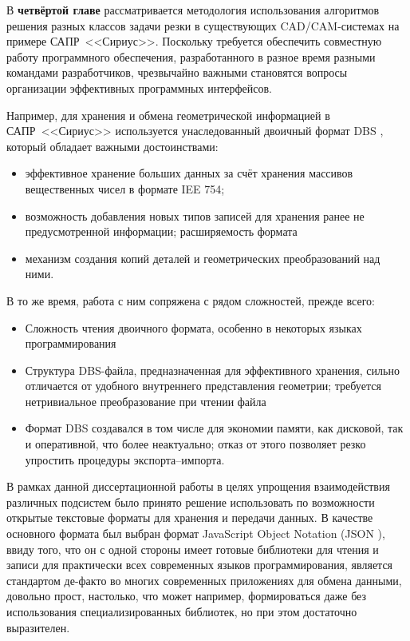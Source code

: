 
В {\bf четвёртой главе}
рассматривается методология
использования алгоритмов решения
разных классов задачи резки в существующих
CAD/CAM-системах на примере
САПР~<<Сириус>>.
Поскольку требуется обеспечить
совместную работу программного обеспечения,
разработанного в разное время разными командами разработчиков,
чрезвычайно важными становятся вопросы
организации эффективных программных интерфейсов.

Например, для хранения и обмена геометрической информацией
в САПР~<<Сириус>>
используется унаследованный двоичный формат DBS
\cite{bi:DBS},
который обладает важными достоинствами:
\begin{itemize}
  \item
  эффективное хранение больших данных за счёт хранения массивов вещественных чисел в формате IEE 754;
  \item
  возможность добавления новых типов записей для хранения ранее не предусмотренной информации;
  расширяемость формата
  \item
  механизм создания копий деталей и геометрических преобразований над ними.
\end{itemize}

В то же время,
работа с ним сопряжена с рядом сложностей,
прежде всего:
\begin{itemize}
  \item
  Сложность чтения двоичного формата,
  особенно в некоторых языках программирования
  \item
  Структура DBS-файла,
  предназначенная для эффективного хранения,
  сильно отличается от удобного внутреннего представления
  геометрии;
  требуется нетривиальное преобразование при чтении файла
  \item
  Формат DBS создавался в том числе для экономии памяти,
  как дисковой, так и оперативной,
  что более неактуально;
  отказ от этого позволяет резко упростить процедуры экспорта--импорта.
\end{itemize}

В рамках данной диссертационной работы
в целях упрощения взаимодействия различных подсистем
было принято решение использовать по возможности
открытые текстовые форматы для хранения и передачи данных.
В качестве основного формата был выбран формат
JavaScript Object Notation
(JSON
\autocite{bi:JSON}),
ввиду того, что
он с одной стороны имеет готовые библиотеки для чтения и записи
для практически всех современных языков
программирования,
является стандартом де-факто во многих
современных приложениях для обмена данными,
довольно прост,
настолько, что может например,
формироваться даже без использования специализированных библиотек,
но при этом достаточно выразителен.

